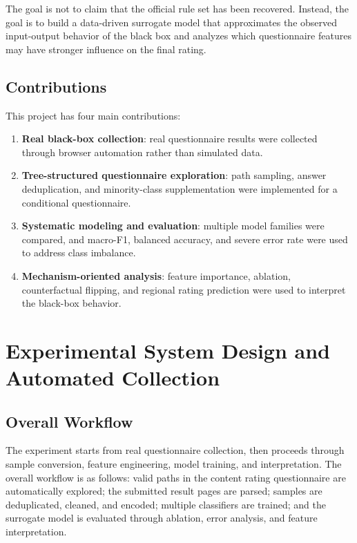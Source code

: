 \documentclass[UTF8,a4paper,12pt]{ctexart}
\providecommand{\tightlist}{%
  \setlength{\itemsep}{0pt}\setlength{\parskip}{0pt}}
\begin{document}
The goal is not to claim that the official rule set has been recovered. Instead, the goal is to build a data-driven surrogate model that approximates the observed input-output behavior of the black box and analyzes which questionnaire features may have stronger influence on the final rating.

\subsection{Contributions}\label{contributions}

This project has four main contributions:

\begin{enumerate}
\def\labelenumi{\arabic{enumi}.}
\tightlist
\item
  \textbf{Real black-box collection}: real questionnaire results were collected through browser automation rather than simulated data.
\item
  \textbf{Tree-structured questionnaire exploration}: path sampling, answer deduplication, and minority-class supplementation were implemented for a conditional questionnaire.
\item
  \textbf{Systematic modeling and evaluation}: multiple model families were compared, and macro-F1, balanced accuracy, and severe error rate were used to address class imbalance.
\item
  \textbf{Mechanism-oriented analysis}: feature importance, ablation, counterfactual flipping, and regional rating prediction were used to interpret the black-box behavior.
\end{enumerate}

\section{Experimental System Design and Automated Collection}\label{experimental-system-design-and-automated-collection}

\subsection{Overall Workflow}\label{overall-workflow}

The experiment starts from real questionnaire collection, then proceeds through sample conversion, feature engineering, model training, and interpretation. The overall workflow is as follows: valid paths in the content rating questionnaire are automatically explored; the submitted result pages are parsed; samples are deduplicated, cleaned, and encoded; multiple classifiers are trained; and the surrogate model is evaluated through ablation, error analysis, and feature interpretation.
\end{document}
